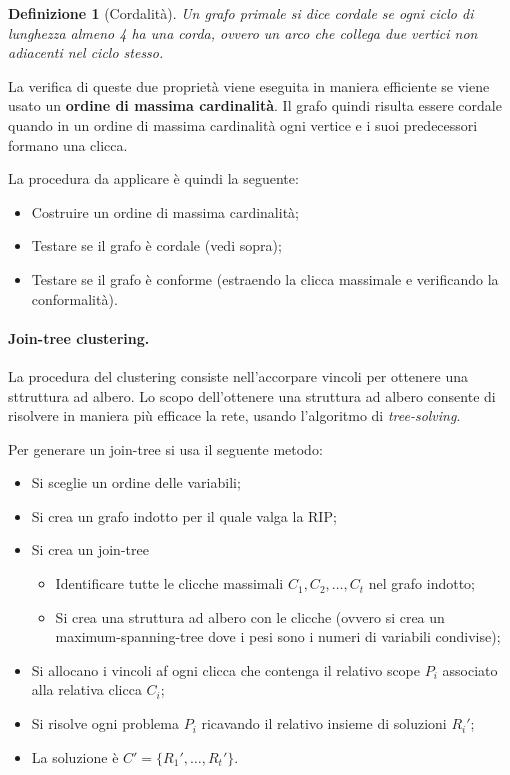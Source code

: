 \documentclass[a4paper, 11pt]{article}
\newtheorem{definit}{Definizione}[subsection]
\begin{document}
\begin{definit}[Cordalità]
	Un grafo primale si dice cordale se ogni ciclo di lunghezza almeno 4 ha una corda, ovvero un arco che collega due vertici non adiacenti nel ciclo stesso.
\end{definit}

La verifica di queste due proprietà viene eseguita in maniera efficiente se viene usato un \textbf{ordine di massima cardinalità}. Il grafo quindi risulta essere cordale quando in un ordine di massima cardinalità ogni vertice e i suoi predecessori formano una clicca. 

La procedura da applicare è quindi la seguente:\begin{itemize}
	\item Costruire un ordine di massima cardinalità;
	\item Testare se il grafo è cordale (vedi sopra);
	\item Testare se il grafo è conforme (estraendo la clicca massimale e verificando la conformalità).
\end{itemize}

\paragraph{Join-tree clustering.} La procedura del clustering consiste nell'accorpare vincoli per ottenere una sttruttura ad albero. Lo scopo dell'ottenere una struttura ad albero consente di risolvere in maniera più efficace la rete, usando l'algoritmo di \textit{tree-solving}.

Per generare un join-tree si usa il seguente metodo:
\begin{itemize}
	\item Si sceglie un ordine delle variabili;
	\item Si crea un grafo indotto per il quale valga la RIP;
	\item Si crea un join-tree \begin{itemize}
		\item Identificare tutte le clicche massimali $C_1, C_2, \dots, C_t$ nel grafo indotto;
		\item Si crea una struttura ad albero con le clicche (ovvero si crea un maximum-spanning-tree dove i pesi sono i numeri di variabili condivise);
	\end{itemize}
	\item Si allocano i vincoli af ogni clicca che contenga il relativo scope $P_i$ associato alla relativa clicca $C_i$;
	\item Si risolve ogni problema $P_i$ ricavando il relativo insieme di soluzioni $R_i'$;
	\item La soluzione è $C' = \lbrace R_1', \dots, R_t' \rbrace $.
\end{itemize}
\end{document}
